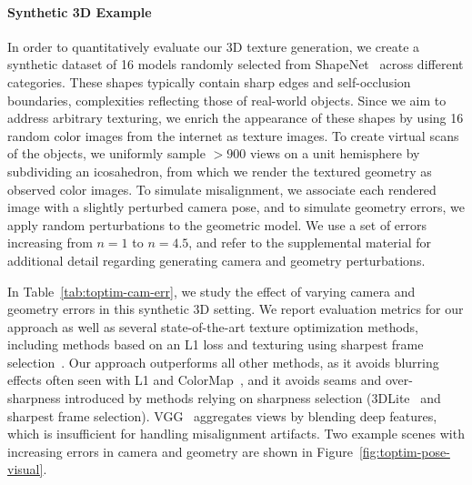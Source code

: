 \paragraph*{Synthetic 3D Example}
In order to quantitatively evaluate our 3D texture generation, we create a synthetic dataset of 16 models randomly selected from ShapeNet~\cite{chang2015shapenet} across different categories. 
These shapes typically contain sharp edges and self-occlusion boundaries, complexities reflecting those of real-world objects.
Since we aim to address arbitrary texturing, we enrich the appearance of these shapes by using 16 random color images from the internet as texture images. 
To create virtual scans of the objects, we uniformly sample $>900$ views on a unit hemisphere by subdividing an icosahedron, from which we render the textured geometry as observed color images. 
To simulate misalignment, we associate each rendered image with a slightly perturbed camera pose, and to simulate geometry errors, we apply random perturbations to the geometric model.
We use a set of errors increasing from $n=1$ to $n=4.5$, and refer to the supplemental material for additional detail regarding generating camera and geometry perturbations.


In Table~\ref{tab:toptim-cam-err}, we study the effect of varying camera and geometry errors in this synthetic 3D setting.  We report evaluation metrics for our approach as well as several state-of-the-art texture optimization methods, including methods based on an L1 loss and texturing using sharpest frame selection~\cite{vu2011bf}.
Our approach outperforms all other methods, as it avoids blurring effects often seen with L1 and ColorMap~\cite{zhou2014color}, and it avoids seams and over-sharpness introduced by methods relying on sharpness selection (3DLite~\cite{huang20173dlite} and sharpest frame selection).
VGG~\cite{johnson2016perceptual} aggregates views by blending deep features, which is insufficient for handling misalignment artifacts.
Two example scenes with increasing errors in camera and geometry are shown in Figure~\ref{fig:toptim-pose-visual}.

